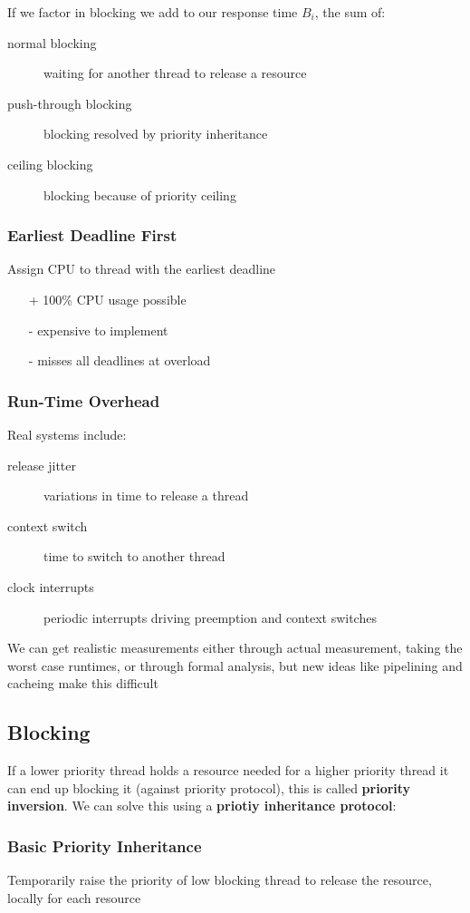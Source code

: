 \documentclass[]{article}
\theoremstyle{definition}
\begin{document}
	If we factor in blocking we add to our response time $B_i$, the sum of:
	\begin{description}
		\item[normal blocking] waiting for another thread to release a resource
		\item[push-through blocking] blocking resolved by priority inheritance
		\item[ceiling blocking] blocking because of priority ceiling
	\end{description}

	\subsubsection{Earliest Deadline First}
	Assign CPU to thread with the earliest deadline
	\begin{itemize}
		\item[+] 100\% CPU usage possible
		\item[-] expensive to implement
		\item[-] misses all deadlines at overload
	\end{itemize}

	\subsubsection{Run-Time Overhead}
	Real systems include:
	\begin{description}
		\item[release jitter] variations in time to release a thread
		\item[context switch] time to switch to another thread
		\item[clock interrupts] periodic interrupts driving preemption and context switches
	\end{description}

	We can get realistic measurements either through actual measurement, taking the worst case runtimes, or through formal analysis, but new ideas like pipelining and cacheing make this difficult
	\subsection{Blocking}
	If a lower priority thread holds a resource needed for a higher priority thread it can end up blocking it (against priority protocol), this is called \textbf{priority inversion}. We can solve this using a \textbf{priotiy inheritance protocol}:

	\subsubsection{Basic Priority Inheritance} 
	Temporarily raise the priority of low blocking thread to release the resource, locally for each resource
\end{document}

